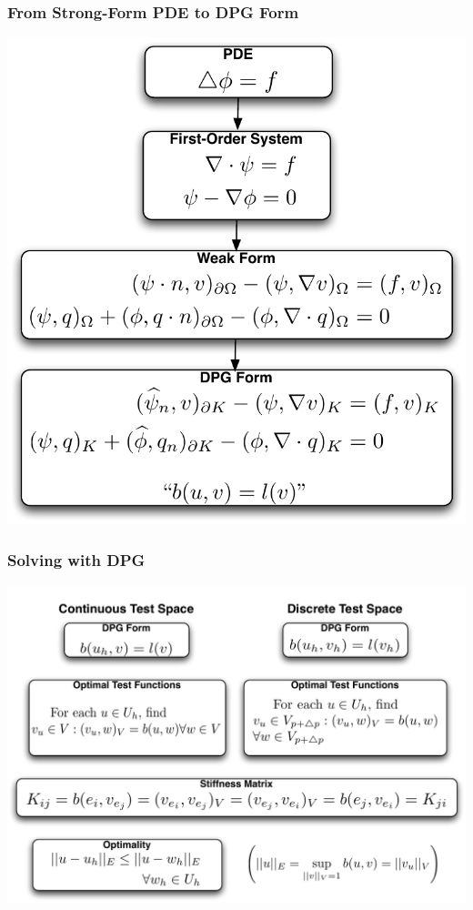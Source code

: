 \documentclass[mathserif]{beamer}
\begin{document}
\begin{frame}                                                                                                                                                                          
\frametitle{From Strong-Form PDE to DPG Form}
\begin{center}
\includegraphics[width=.6\linewidth]{DPGFormCartoon}\\
\end{center}
\end{frame}              
\begin{frame}                                                                                                                                                                          
\frametitle{Solving with DPG}
\begin{center}
\includegraphics[width=0.9\linewidth]{DPGSolveCartoon}\\
\end{center}
\end{frame}
\end{document}

